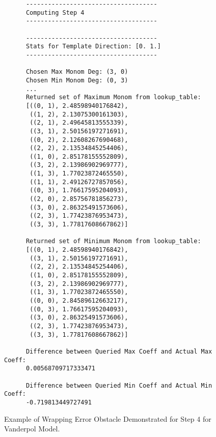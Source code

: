 \begin{figure}
\begin{verbatim}
      ------------------------------------
      Computing Step 4
      ------------------------------------

      ------------------------------------
      Stats for Template Direction: [0. 1.]
      ------------------------------------

      Chosen Max Monom Deg: (3, 0)
      Chosen Min Monom Deg: (0, 3)
      ...
      Returned set of Maximum Monom from lookup_table:
      [((0, 1), 2.48598940176842),
       ((1, 2), 2.13075300161303),
       ((2, 1), 2.49645813555339),
       ((3, 1), 2.50156197271691),
       ((0, 2), 2.12608267690468),
       ((2, 2), 2.13534845254406),
       ((1, 0), 2.85178155552809),
       ((3, 2), 2.13986902969777),
       ((1, 3), 1.77023872465550),
       ((1, 1), 2.49126727857056),
       ((0, 3), 1.76617595204093),
       ((2, 0), 2.85756781856273),
       ((3, 0), 2.86325491573606),
       ((2, 3), 1.77423876953473),
       ((3, 3), 1.77817608667862)]

      Returned set of Minimum Monom from lookup_table:
      [((0, 1), 2.48598940176842),
       ((3, 1), 2.50156197271691),
       ((2, 2), 2.13534845254406),
       ((1, 0), 2.85178155552809),
       ((3, 2), 2.13986902969777),
       ((1, 3), 1.77023872465550),
       ((0, 0), 2.84589612663217),
       ((0, 3), 1.76617595204093),
       ((3, 0), 2.86325491573606),
       ((2, 3), 1.77423876953473),
       ((3, 3), 1.77817608667862)]

      Difference between Queried Max Coeff and Actual Max Coeff:
      0.00568709717333471

      Difference between Queried Min Coeff and Actual Min Coeff:
      -0.719813449727491
\end{verbatim}

\caption{Example of Wrapping Error Obstacle Demonstrated for Step 4 for Vanderpol Model.}
\label{fig:bern_prune_wrapping_output}
\end{figure}
